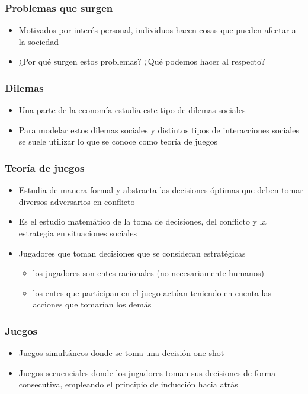 \documentclass{beamer}
\begin{document}
\begin{frame}
\frametitle{ Problemas que surgen}
\begin{itemize}
    \item Motivados por interés personal, individuos hacen cosas que pueden afectar a la sociedad
    \item ¿Por qué surgen estos problemas? ¿Qué podemos hacer al respecto?
\end{itemize}
\end{frame}

\begin{frame}
\frametitle{ Dilemas}
\begin{itemize}
    \item Una parte de la economía estudia este tipo de dilemas sociales
    \item Para modelar estos dilemas sociales y distintos tipos de interacciones sociales se suele utilizar lo que se conoce como teoría de juegos
    \end{itemize}
\end{frame}

\begin{frame}
\frametitle{ Teoría de juegos}
\begin{itemize}
\item Estudia de manera formal y abstracta las decisiones óptimas que deben tomar diversos adversarios en conflicto
\item Es el estudio matemático de la toma de decisiones, del conflicto y la estrategia en situaciones sociales
\item Jugadores que toman decisiones que se consideran estratégicas
    \begin{itemize}
        \item los jugadores son entes racionales (no necesariamente humanos)
        \item los entes que participan en el juego actúan teniendo en cuenta las acciones que tomarían los demás
            \end{itemize}
\end{itemize}
\end{frame}

\begin{frame}
\frametitle{ Juegos}
\begin{itemize}
\item Juegos simultáneos donde se toma una decisión one-shot  
\item Juegos secuenciales donde los jugadores toman sus decisiones de forma consecutiva, empleando el principio de inducción hacia atrás
\end{itemize}
\end{frame}
\end{document}
